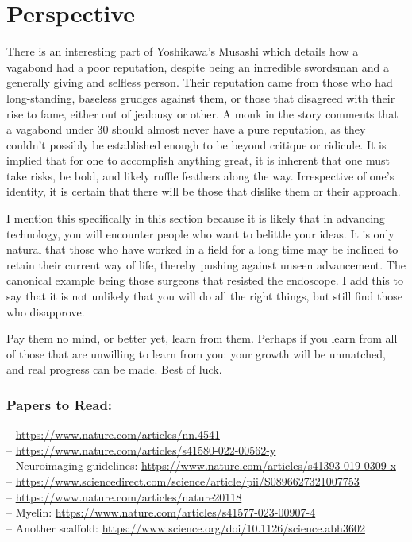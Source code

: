 \documentclass[12pt]{report}
\begin{document}
\section{Perspective}
There is an interesting part of Yoshikawa's Musashi which details how a vagabond had a poor reputation, despite being an incredible swordsman and a generally giving and selfless person. Their reputation came from those who had long-standing, baseless grudges against them, or those that disagreed with their rise to fame, either out of jealousy or other. A monk in the story comments that a vagabond under 30 should almost never have a pure reputation, as they couldn't possibly be established enough to be beyond critique or ridicule. It is implied that for one to accomplish anything great, it is inherent that one must take risks, be bold, and likely ruffle feathers along the way. Irrespective of one's identity, it is certain that there will be those that dislike them or their approach.\newline

I mention this specifically in this section because it is likely that in advancing technology, you will encounter people who want to belittle your ideas. It is only natural that those who have worked in a field for a long time may be inclined to retain their current way of life, thereby pushing against unseen advancement. The canonical example being those surgeons that resisted the endoscope. I add this to say that it is not unlikely that you will do all the right things, but still find those who disapprove.\newline

Pay them no mind, or better yet, learn from them. Perhaps if you learn from all of those that are unwilling to learn from you: your growth will be unmatched, and real progress can be made. Best of luck. 

\subsubsection{Papers to Read:}

-- \url{https://www.nature.com/articles/nn.4541}\\
-- \url{https://www.nature.com/articles/s41580-022-00562-y}\\
-- Neuroimaging guidelines: \url{https://www.nature.com/articles/s41393-019-0309-x}\\
-- \url{https://www.sciencedirect.com/science/article/pii/S0896627321007753}\\
-- \url{https://www.nature.com/articles/nature20118}\\
-- Myelin: \url{https://www.nature.com/articles/s41577-023-00907-4} \\
-- Another scaffold: \url{https://www.science.org/doi/10.1126/science.abh3602}
\end{document}
